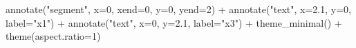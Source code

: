 \documentclass[
  letterpaper,
]{book}
\newenvironment{Shaded}{\begin{snugshade}}{\end{snugshade}}
\newcommand{\AttributeTok}[1]{\textcolor[rgb]{0.40,0.45,0.13}{#1}}
\newcommand{\DecValTok}[1]{\textcolor[rgb]{0.68,0.00,0.00}{#1}}
\newcommand{\FloatTok}[1]{\textcolor[rgb]{0.68,0.00,0.00}{#1}}
\newcommand{\FunctionTok}[1]{\textcolor[rgb]{0.28,0.35,0.67}{#1}}
\newcommand{\NormalTok}[1]{\textcolor[rgb]{0.00,0.23,0.31}{#1}}
\newcommand{\SpecialCharTok}[1]{\textcolor[rgb]{0.37,0.37,0.37}{#1}}
\newcommand{\StringTok}[1]{\textcolor[rgb]{0.13,0.47,0.30}{#1}}
\begin{document}
\begin{Shaded}
\begin{Highlighting}[]
  \FunctionTok{annotate}\NormalTok{(}\StringTok{"segment"}\NormalTok{, }\AttributeTok{x=}\DecValTok{0}\NormalTok{, }\AttributeTok{xend=}\DecValTok{0}\NormalTok{, }\AttributeTok{y=}\DecValTok{0}\NormalTok{, }\AttributeTok{yend=}\DecValTok{2}\NormalTok{) }\SpecialCharTok{+}
  \FunctionTok{annotate}\NormalTok{(}\StringTok{"text"}\NormalTok{, }\AttributeTok{x=}\FloatTok{2.1}\NormalTok{, }\AttributeTok{y=}\DecValTok{0}\NormalTok{, }\AttributeTok{label=}\StringTok{"x1"}\NormalTok{) }\SpecialCharTok{+}
  \FunctionTok{annotate}\NormalTok{(}\StringTok{"text"}\NormalTok{, }\AttributeTok{x=}\DecValTok{0}\NormalTok{, }\AttributeTok{y=}\FloatTok{2.1}\NormalTok{, }\AttributeTok{label=}\StringTok{"x3"}\NormalTok{) }\SpecialCharTok{+}
  \FunctionTok{theme\_minimal}\NormalTok{() }\SpecialCharTok{+}
  \FunctionTok{theme}\NormalTok{(}\AttributeTok{aspect.ratio=}\DecValTok{1}\NormalTok{)}
\end{Highlighting}
\end{Shaded}
\end{document}
